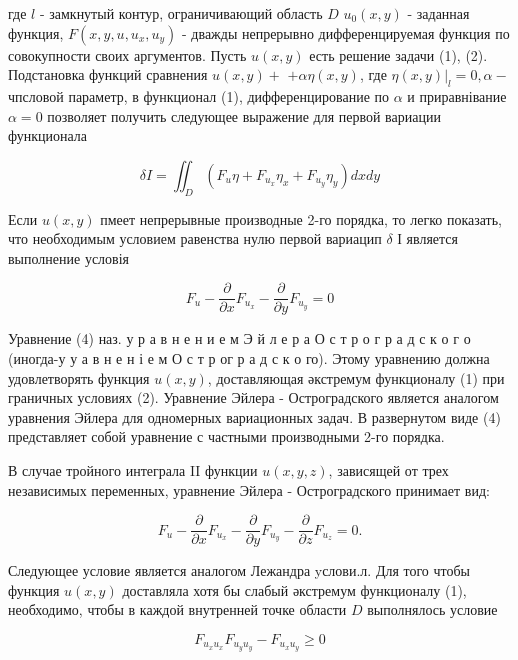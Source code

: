 \documentclass[10pt]{article}
\begin{document}
где $l$ - замкнутый контур, ограничивающий область $D$ $u_{0}(x, y)$ - заданная функция, $F\left(x, y, u, u_{x}, u_{y}\right)$ - дважды непрерывно дифференцируемая функция по совокупности своих аргументов. Пусть $u(x, y)$ есть решение задачи (1), (2). Подстановка функций сравнения $u(x, y)+$ $+\alpha \eta(x, y)$, где $\left.\eta(x, y)\right|_{l}=0, \alpha-$ чпсловой параметр, в функционал (1), дифференцирование по $\alpha$ и приравнівание $\alpha=0$ позволяет получить следующее выражение для первой вариации функционала



\[

\delta I=\iint_{D}\left(F_{u} \eta+F_{u_{x}} \eta_{x}+F_{u_{y}} \eta_{y}\right) d x d y

\]



Если $u(x, y)$ пмеет непрерывные производные 2-го порядка, то легко показать, что необходимым условием равенства нулю первой вариацип $\delta$ І является выполнение условія



\[

F_{u}-\frac{\partial}{\partial x} F_{u_{x}}-\frac{\partial}{\partial y} F_{u_{y}}=0

\]



Уравнение (4) наз. у р а в н е н и е м Э й л е р а О с т р о г р а д с к о г о (иногда-у у а в н е н і е м О с т р ог р а д с к о го). Этому уравнению должна удовлетворять функция $u(x, y)$, доставляющая әкстремум функционалу (1) при граничных условиях (2). Уравнение Эйлера - Остроградского является аналогом уравнения Эйлера для одномерных вариационных задач. В развернутом виде (4) представляет собой уравнение с частными производными 2-го порядка.



В случае тройного интеграла II функции $u(x, y, z)$, зависящей от трех независимых переменных, уравнение Эйлера - Остроградского принимает вид:



\[

F_{u}-\frac{\partial}{\partial x} F_{u_{x}}-\frac{\partial}{\partial y} F_{u_{y}}-\frac{\partial}{\partial z} F_{u_{z}}=0 .

\]



Следующее условие является аналогом Лежандра yслови.л. Для того чтобы функция $u(x, y)$ доставляла хотя бы слабый әкстремум функционалу (1), необходимо, чтобы в каждой внутренней точке области $D$ выполнялось условие



\[

F_{u_{x} u_{x}} F_{u_{y} u_{y}}-F_{u_{x} u_{y}} \geqslant 0

\]
\end{document}
